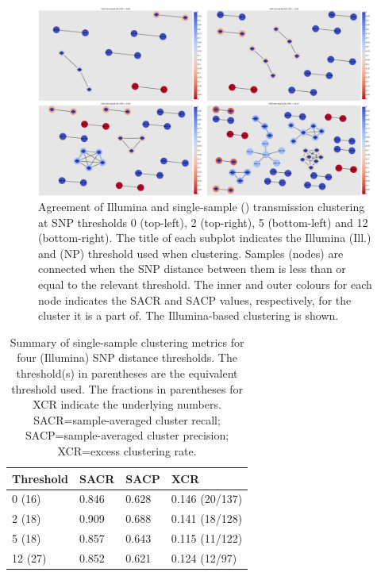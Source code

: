 \begin{figure}
\begin{center}
\includegraphics[width=0.90\columnwidth]{Chapter2/Figs/pandora_map_clusters.png}
\caption{{Agreement of Illumina and \pandora{} single-sample (\ont{}) transmission clustering at SNP thresholds 0 (top-left), 2 (top-right), 5 (bottom-left) and 12 (bottom-right). The title of each subplot indicates the Illumina (Ill.) and \ont{} (NP) threshold used when clustering. Samples (nodes) are connected when the SNP distance between them is less than or equal to the relevant threshold. The inner and outer colours for each node indicates the SACR and SACP values, respectively, for the cluster it is a part of. The Illumina-based clustering is shown.
{\label{fig:map-clusters}}%
}}
\end{center}
\end{figure}

\begin{table}
\centering
\begin{tabular}{llll}
Threshold & SACR  & SACP  & XCR            \\
\hline
0 (16)    & 0.846 & 0.628 & 0.146 (20/137) \\
\hline
2 (18)    & 0.909 & 0.688 & 0.141 (18/128) \\
\hline
5 (18)    & 0.857 & 0.643 & 0.115 (11/122) \\
\hline
12 (27)   & 0.852 & 0.621 & 0.124 (12/97)  
\end{tabular}
\caption{Summary of \pandora{} single-sample clustering metrics for four (Illumina) SNP distance thresholds. The threshold(s) in parentheses are the \ont{} equivalent threshold used. The fractions in parentheses for XCR indicate the underlying numbers. SACR=sample-averaged cluster recall; SACP=sample-averaged cluster precision; XCR=excess clustering rate.}
\label{tab:map-cluster-summary}
\end{table}

